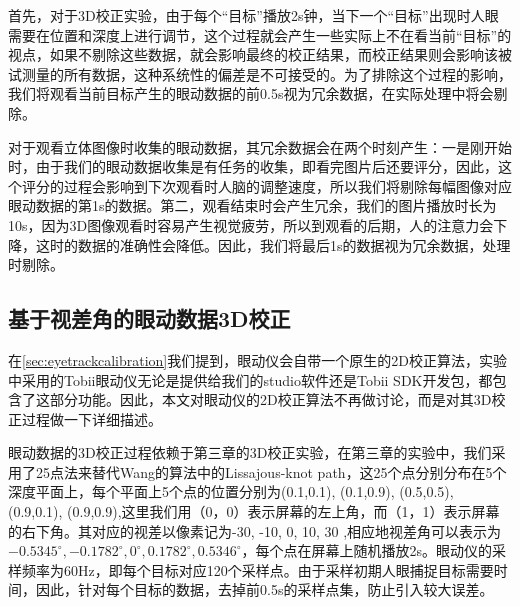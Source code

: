 首先，对于3D校正实验，由于每个“目标”播放2s钟，当下一个“目标”出现时人眼需要在位置和深度上进行调节，这个过程就会产生一些实际上不在看当前“目标”的视点，如果不剔除这些数据，就会影响最终的校正结果，而校正结果则会影响该被试测量的所有数据，这种系统性的偏差是不可接受的。为了排除这个过程的影响，我们将观看当前目标产生的眼动数据的前0.5s视为冗余数据，在实际处理中将会剔除。

对于观看立体图像时收集的眼动数据，其冗余数据会在两个时刻产生：一是刚开始时，由于我们的眼动数据收集是有任务的收集，即看完图片后还要评分，因此，这个评分的过程会影响到下次观看时人脑的调整速度，所以我们将剔除每幅图像对应眼动数据的第1s的数据。第二，观看结束时会产生冗余，我们的图片播放时长为10s，因为3D图像观看时容易产生视觉疲劳，所以到观看的后期，人的注意力会下降，这时的数据的准确性会降低。因此，我们将最后1s的数据视为冗余数据，处理时剔除。
\subsection{基于视差角的眼动数据3D校正}
\label{sec:calibraiton}
在\ref{sec:eyetrackcalibration}我们提到，眼动仪会自带一个原生的2D校正算法，实验中采用的Tobii眼动仪无论是提供给我们的studio软件还是Tobii SDK开发包，都包含了这部分功能。因此，本文对眼动仪的2D校正算法不再做讨论，而是对其3D校正过程做一下详细描述。

眼动数据的3D校正过程依赖于第三章的3D校正实验，在第三章的实验中，我们采用了25点法来替代Wang的算法\parencite{wang2014online}中的Lissajous-knot path，这25个点分别分布在5个深度平面上，每个平面上5个点的位置分别为(0.1,0.1), (0.1,0.9), (0.5,0.5), (0.9,0.1), (0.9,0.9),这里我们用（0，0）表示屏幕的左上角，而（1，1）表示屏幕的右下角。其对应的视差以像素记为-30, -10, 0, 10, 30 ,相应地视差角可以表示为$ -{0.5345^\circ }, -{0.1782^\circ }, {0^\circ }, {0.1782^\circ }, {0.5346^\circ }$，每个点在屏幕上随机播放2s。眼动仪的采样频率为60Hz，即每个目标对应120个采样点。由于采样初期人眼捕捉目标需要时间，因此，针对每个目标的数据，去掉前0.5s的采样点集，防止引入较大误差。

